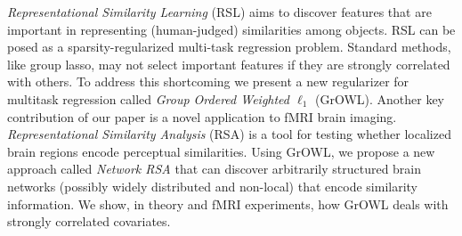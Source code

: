{\em Representational Similarity Learning} (RSL) aims to discover features that
are important in representing (human-judged) similarities among objects.  RSL
can be posed as a sparsity-regularized multi-task regression problem. Standard
methods, like group lasso, may not select important features if they are
strongly correlated with others. To address this shortcoming we present a new
regularizer for multitask regression called \emph{Group Ordered Weighted
  $\ell_1$} (GrOWL). Another key contribution of our paper is a novel
application to fMRI brain imaging.  \emph{Representational Similarity Analysis}
(RSA) is a tool for testing whether localized brain regions encode perceptual
similarities. Using GrOWL, we propose a new approach called {\em Network RSA}
that can discover arbitrarily structured brain networks (possibly widely
distributed and non-local) that encode similarity information. We show, in
theory and fMRI experiments, how GrOWL deals with strongly correlated
covariates.
